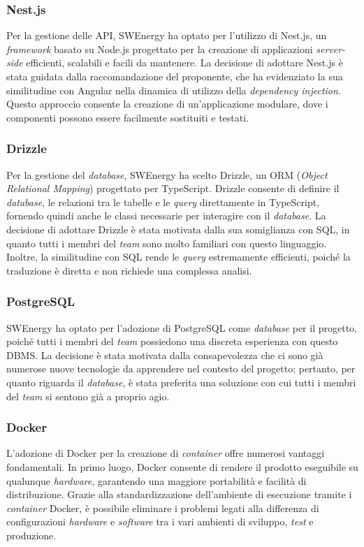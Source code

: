\subsubsection{Nest.js}
Per la gestione delle API, SWEnergy ha optato per l'utilizzo di Nest.js, un
\textit{framework} basato su Node.js progettato per la creazione di applicazioni
\textit{server-side} efficienti, scalabili e facili da mantenere. La decisione di
adottare Nest.js è stata guidata dalla raccomandazione del proponente, che ha
evidenziato la sua similitudine con Angular nella dinamica di utilizzo della
\textit{dependency injection}. Questo approccio consente la creazione di
un'applicazione modulare, dove i componenti possono essere facilmente sostituiti
e testati.


\subsubsection{Drizzle}
Per la gestione del \textit{database}, SWEnergy ha scelto Drizzle, un ORM (\textit{Object
	Relational Mapping}) progettato per TypeScript. Drizzle consente di definire
il \textit{database}, le relazioni tra le tabelle e le \textit{query} direttamente in
TypeScript, fornendo quindi anche le classi necessarie per interagire con il
\textit{database}. La decisione di adottare Drizzle è stata motivata dalla sua
somiglianza con SQL, in quanto tutti i membri del \textit{team} sono molto familiari
con questo linguaggio. Inoltre, la similitudine con SQL rende le
\textit{query} estremamente efficienti, poiché la traduzione è diretta e non
richiede una complessa analisi.


\subsubsection{PostgreSQL}
SWEnergy ha optato per l'adozione di PostgreSQL come \textit{database} per il progetto,
poiché tutti i membri del \textit{team} possiedono una discreta esperienza con questo
DBMS. La decisione è stata motivata dalla consapevolezza che ci sono già
numerose nuove tecnologie da apprendere nel contesto del progetto; pertanto, per
quanto riguarda il \textit{database}, è stata preferita una soluzione con cui tutti i
membri del \textit{team} si sentono già a proprio agio.


\subsubsection{Docker}
L'adozione di Docker per la creazione di \textit{container} offre numerosi vantaggi fondamentali.
In primo luogo, Docker consente di rendere il prodotto eseguibile su qualunque \textit{hardware}, garantendo una maggiore portabilità e facilità di distribuzione.
Grazie alla standardizzazione dell'ambiente di esecuzione tramite i \textit{container} Docker, è possibile eliminare i problemi legati alla differenza di configurazioni \textit{hardware} e \textit{software} tra i vari ambienti di sviluppo, \textit{test} e produzione.

